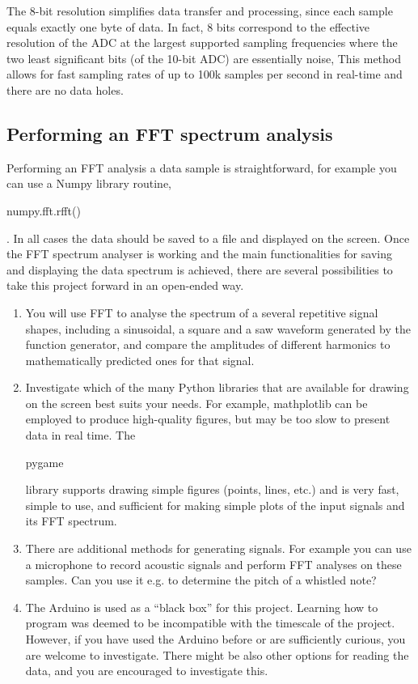 \begin{enumerate}
\newpage


 The 8-bit resolution simplifies data transfer and processing, since each sample equals exactly one byte of data. In fact, 8 bits correspond to the effective resolution of the ADC at the largest supported sampling frequencies where the two least significant bits (of the 10-bit ADC) are essentially noise,
This method allows for fast sampling rates of up to 100k samples per second in real-time and there are no data holes.
\end{enumerate}

\subsection{Performing an FFT spectrum analysis}

Performing an FFT analysis a data sample is straightforward, for example you can use a Numpy library routine, \begin{tt}numpy.fft.rfft()\end{tt}. In all cases the data should be saved to a file and displayed on the screen.  Once the FFT spectrum analyser is working and the main functionalities for saving and displaying the data spectrum is achieved, there are several possibilities to take this project forward in an open-ended way. 

\begin{enumerate}

\item	You will use FFT to analyse the spectrum of a several repetitive signal shapes, including a sinusoidal, a square and a saw waveform generated by the function generator, and compare the amplitudes of different harmonics to mathematically predicted ones for that signal.

\item Investigate which of the many Python libraries that are available for drawing on the screen best suits your needs. For example, mathplotlib can be employed to produce high-quality figures, but may be too slow to present data in real time. The \begin{tt}pygame\end{tt} library supports drawing simple figures (points, lines, etc.) and is very fast, simple to use, and sufficient for making simple plots of the input signals and its FFT spectrum.

\item There are additional methods for generating signals. For example you can use a microphone to record acoustic signals and perform FFT analyses on these samples. Can you use it e.g. to determine the pitch of a whistled note?

\item The Arduino is used as a ``black box'' for this project. Learning how to program was deemed to be incompatible with the timescale of the project. However, if you have used the Arduino before or are sufficiently curious, you are welcome to investigate. There might be also other options for reading the data, and you are encouraged to investigate this.

\end{enumerate}

